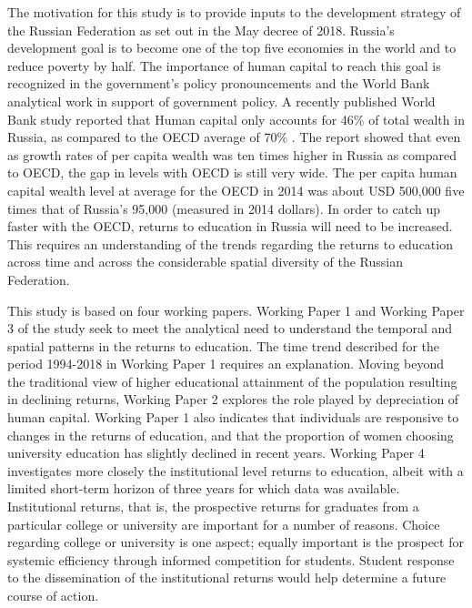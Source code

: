 \documentclass[alpha-refs]{wiley-article-04t}
\begin{document}
The motivation for this study is to provide inputs to the development 
strategy of the Russian Federation as set out in the May decree of 2018. 
Russia's development goal is to become one of the top five economies in 
the world and to reduce poverty by half. The importance of human capital to 
reach this goal is recognized in the government's policy pronouncements and 
the World Bank analytical work in support of government policy. 
A recently published World Bank study reported that Human capital  only 
accounts for 46\% of total wealth in Russia, as compared to the OECD 
average of 70\% \parencite{Naikal2019}. The report showed that even as 
growth rates of per capita  wealth was ten times higher in Russia as 
compared to OECD, the gap in levels with OECD is still very wide. The per 
capita human capital wealth  level at average for the OECD in 2014 was 
about USD 500,000 \textendash  five times that of Russia's 95,000 (measured 
in  2014 dollars). In order to catch up faster with the OECD, returns to 
education  in Russia will need to be increased. This requires an 
understanding of the trends regarding the returns to education across time 
and across the considerable spatial diversity of the Russian Federation. 


\vspace{1em}


This study is based on four working papers. Working Paper 1 and 
Working Paper 3 of the study seek to meet the analytical need to understand 
the temporal and spatial patterns in the returns to education. The time 
trend described for the period 1994-2018 in Working Paper 1 requires an 
explanation. Moving beyond the traditional view of higher 
educational attainment of the population resulting in declining returns, 
Working Paper 2 explores the role played by depreciation of human capital. 
Working Paper 1 also indicates that individuals are responsive to changes 
in the returns of education, and that the proportion of women choosing 
university education has slightly declined in recent years. Working Paper 4 
investigates more closely the institutional level returns to education, 
albeit with a limited short-term horizon of three years for which data was 
available. Institutional returns, that is, the prospective returns for 
graduates from a particular college or university are important for a 
number of reasons. Choice regarding college or university is one aspect; 
equally important is the prospect for systemic efficiency through informed 
competition for students. Student response to the dissemination of the 
institutional returns would help determine a future course of action. 
\end{document}

